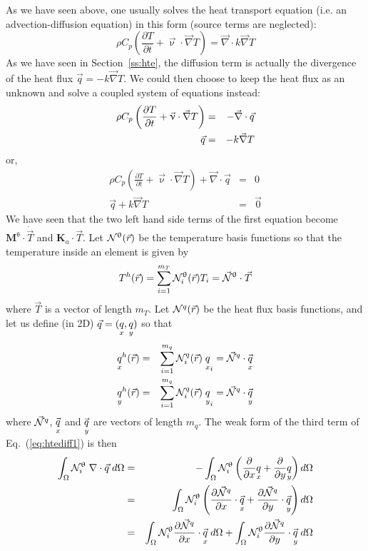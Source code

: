 
As we have seen above, one usually solves the heat transport equation (i.e. 
an advection-diffusion equation) in this form (source terms are neglected):
\begin{equation}
\rho C_p \left( \frac{\partial T}{\partial t} + {\vec \upnu}\cdot {\vec\nabla T} \right)
= {\vec \nabla} \cdot k \vec\nabla T 
\end{equation}
As we have seen in Section~\ref{ss:hte}, the diffusion term is actually the divergence of the heat flux
$\vec{q}=-k \vec \nabla T$. We could then choose to keep the heat flux as an unknown and 
solve a coupled system of equations instead:
\begin{eqnarray}
\rho C_p \left( \frac{\partial T}{\partial t} + {\vec \upnu}\cdot {\vec\nabla T} \right)
&=& - {\vec \nabla} \cdot \vec{q} \nonumber\\ 
\vec{q} &=& - k \vec \nabla T \nonumber
\end{eqnarray}
or, 
\begin{eqnarray}
\rho C_p \left( \frac{\partial T}{\partial t} + {\vec \upnu}\cdot {\vec\nabla T} \right)
+ {\vec \nabla} \cdot \vec{q} &=& 0 \label{eq:htediff1}\\ 
\vec{q} + k \vec \nabla T &=& \vec{0} \label{eq:htediff2}
\end{eqnarray}
We have seen that the two left hand side terms of the first equation become 
${\bm M}^\uptheta \cdot \dot{\vec{T}}$ and ${\bm K}_a \cdot \vec{T}$.
Let ${\mathcal{N}}^\uptheta(\vec{r})$ be the temperature basis functions so that the temperature inside an element is 
given by
\begin{equation}
T^h({\vec r}) = \sum_{i=1}^{m_T} {\mathcal{N}}^\uptheta_i ({\vec r}) T_i = \vec {{\mathcal{N}}}^\uptheta \cdot \vec T
\end{equation}
where $\vec T$ is a vector of length $m_T$.
Let ${\mathcal{N}}^q(\vec{r})$ be the heat flux basis functions, 
and let us define (in 2D) $\vec{q}=(\underset{\tiny x}{q},\underset{\tiny y}{q})$ so that 
\begin{eqnarray}
\underset{\tiny x}{q}^h({\vec r}) &=& \sum_{i=1}^{m_q} {\mathcal{N}}^q_i ({\vec r})\; \underset{\tiny x}{q}_i = \vec{{\mathcal{N}}}^q \cdot \vec{\underset{\tiny x}{q}} \\
\underset{\tiny y}{q}^h({\vec r}) &=& \sum_{i=1}^{m_q} {\mathcal{N}}^q_i ({\vec r})\; \underset{\tiny y}{q}_i = \vec{{\mathcal{N}}}^q \cdot \vec{\underset{\tiny y}{q}} 
\end{eqnarray}
where $\vec{{\mathcal{N}}}^q$, $\vec{\underset{\tiny x}{q}}$ and $\vec{\underset{\tiny y}{q}}$ are vectors of length $m_q$.
The weak form of the third term of Eq.~(\ref{eq:htediff1}) is then
\begin{eqnarray}
\int_\Omega {\mathcal{N}}_i^\uptheta \; \nabla \cdot \vec{q} \;  d\Omega
&=& -\int_\Omega {\mathcal{N}}_i^\uptheta  
\left(  \frac{\partial }{\partial x}\underset{\tiny x}{q} + \frac{\partial }{\partial y}\underset{\tiny y}{q} \right) d\Omega \nonumber\\
&=& \int_\Omega {\mathcal{N}}_i^\uptheta  \left(  \frac{\partial \vec{{\mathcal{N}}}^q}{\partial x}\cdot \vec{\underset{\tiny x}{q}}
+  \frac{\partial \vec{{\mathcal{N}}}^q}{\partial y}\cdot \vec{\underset{\tiny y}{q}} \right) d\Omega \nonumber\\
&=& \int_\Omega {\mathcal{N}}_i^\uptheta  \frac{\partial \vec{{\mathcal{N}}}^q}{\partial x}\cdot  \vec{\underset{\tiny x}{q}} \;  d\Omega + 
\int_\Omega  {\mathcal{N}}_i^\uptheta \frac{\partial \vec{{\mathcal{N}}}^q}{\partial y} \cdot \vec{\underset{\tiny y}{q}} \;  d\Omega \nonumber
\end{eqnarray}
